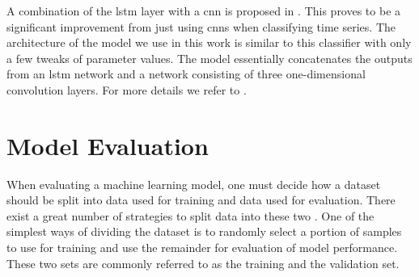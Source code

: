 A combination of the \gls{lstm} layer with a \gls{cnn} is proposed in \citep{karim_majumdar_darabi_chen_2018}. This proves to be a significant improvement from just using \gls{cnn}s when classifying time series. The architecture of the model we use in this work is similar to this classifier with only a few tweaks of parameter values. The model essentially concatenates the outputs from an \gls{lstm} network and a network consisting of three one-dimensional convolution layers. For more details we refer to \citep{karim_majumdar_darabi_chen_2018}.

\section{Model Evaluation}






When evaluating a machine learning model, one must decide how a dataset should be split into data used for training and data used for evaluation. There exist a great number of strategies to split data into these two \citep{raschka}. One of the simplest ways of dividing the dataset is to randomly select a portion of samples to use for training and use the remainder for evaluation of model performance. These two sets are commonly referred to as the training and the validation set.

